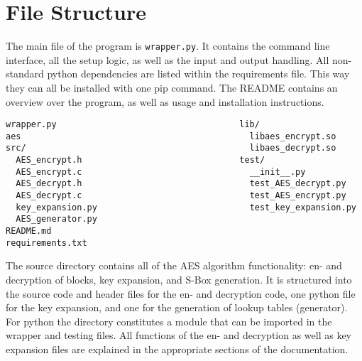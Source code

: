\section{File Structure}
The main file of the program is \lstinline|wrapper.py|. It contains the command line interface, all the setup logic, as well as the input and output handling. All non-standard python dependencies are listed within the requirements file. This way they can all be installed with one pip command. The README contains an overview over the program, as well as usage and installation instructions.


\begin{lstlisting}
wrapper.py                                    lib/
aes                                             libaes_encrypt.so
src/                                            libaes_decrypt.so
  AES_encrypt.h                               test/
  AES_encrypt.c                                 __init__.py
  AES_decrypt.h                                 test_AES_decrypt.py
  AES_decrypt.c                                 test_AES_encrypt.py
  key_expansion.py                              test_key_expansion.py
  AES_generator.py
README.md
requirements.txt
\end{lstlisting}


The source directory contains all of the AES algorithm functionality: en- and decryption of blocks, key expansion, and S-Box generation. It is structured into the source code and header files for the en- and decryption code, one python file for the key expansion, and one for the generation of lookup tables (generator). For python the directory constitutes a module that can be imported in the wrapper and testing files. All functions of the en- and decryption as well as key expansion files are explained in the appropriate sections of the documentation.
